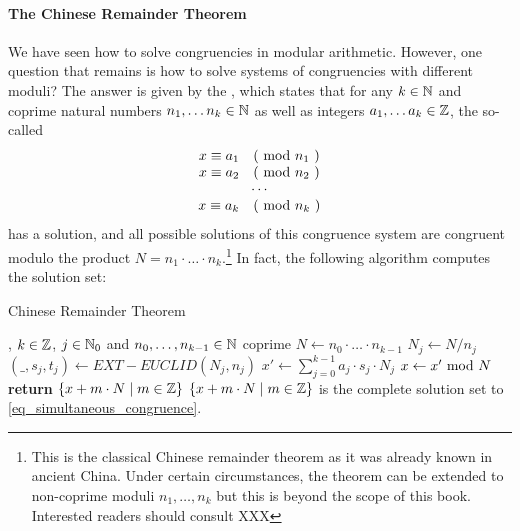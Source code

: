 \paragraph{The Chinese Remainder Theorem} We have seen how to solve congruencies in modular arithmetic. However, one question that remains is how to solve systems of congruencies with different moduli? The answer is given by the , which states that for any $ k \in \mathbb{N} $ and coprime natural numbers $ n_1, \ldots n_k \in \mathbb{N} $ as well as integers $ a_1, \ldots a_k \in \mathbb{Z} $, the so-called 
\begin{equation}
\label{eq_simultaneous_congruence}
\begin{array}{c}
x \equiv a_1 \quad \text{( mod } n_1 \text{ )} \\
x \equiv a_2 \quad \text{( mod } n_2 \text{ )} \\
\cdots \\
x \equiv a_k \quad \text{( mod } n_k \text{ )} \\
\end{array}
\end{equation}
has a solution, and all possible solutions of this congruence system are congruent modulo
the product $N= n_1 \cdot \ldots \cdot n_k $.\footnote{This is the classical Chinese remainder theorem as it was already known in ancient China. Under certain circumstances, the theorem can be extended to non-coprime moduli $ n_1, \ldots, n_k $ but this is beyond the scope of this book. Interested readers should consult XXX } In fact, the following algorithm computes the solution set: 
\begin{algorithm}\caption{Chinese Remainder Theorem}
\label{chinese-remainder-theorem}
\begin{algorithmic}[0]
\Require , $k\in \mathbb{Z}$, $j\in \mathbb{N}_0$ and $n_0,\ldots,n_{k-1} \in \mathbb{N}$ coprime
\State $N\gets n_0\cdot \ldots \cdot n_{k-1}$
\State $N_j\gets N/n_j$
\State $(\_,s_j,t_j)\gets EXT-EUCLID (N_j,n_j)$
\EndWhile
\State $x'\gets \sum_{j=0}^{k-1}a_j\cdot s_j\cdot N_j$
\State $x\gets x' \text{ mod } N$
\State \textbf{return} $\{x+ m\cdot N\;|\; m\in \mathbb{Z}\}$
\EndProcedure
\Ensure $\{x+ m\cdot N\;|\; m\in \mathbb{Z}\}$ is the complete solution set to \ref{eq_simultaneous_congruence}.
\end{algorithmic}
\end{algorithm}


